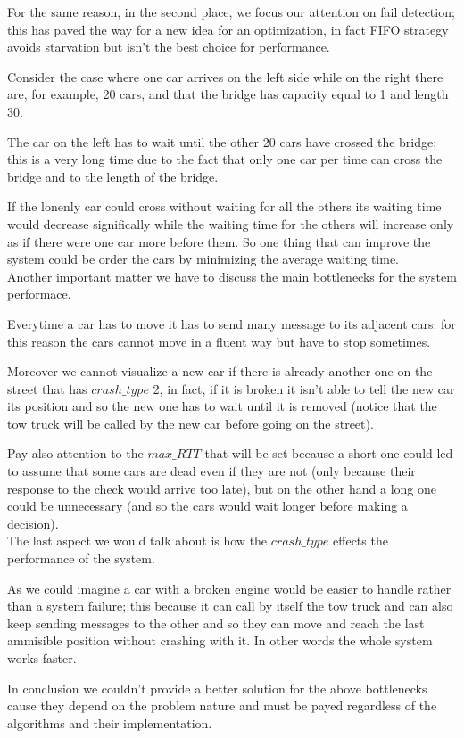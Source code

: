 For the same reason, in the second place, we focus our attention on 
fail detection; this has paved the way for a new idea for an optimization, 
in fact FIFO strategy avoids starvation but isn't the best choice for performance.

Consider the case where one car arrives on the left side while on the right there are, 
for example, 20 cars, and that the bridge has capacity equal to 1 and length 30. 

The car on the left has to wait until the other 20 cars have crossed the bridge; 
this is a very long time due to the fact that only one car per time can cross the bridge 
and to the length of the bridge.

If the lonenly car could cross without waiting for all the others its waiting time would 
decrease significally while the waiting time for the others will increase only 
as if there were one car more before them. 
So one thing that can improve the system could be order the cars by minimizing 
the average waiting time.\\

Another important matter we have to discuss the main bottlenecks
for the system performace. 

Everytime a car has to move it has to send many message to its adjacent cars: 
for this reason the cars cannot move in a fluent way but have to stop sometimes. 

Moreover we cannot visualize a new car if there is already another one on the 
street that has $crash\_type$ 2, in fact, if it is broken it isn't able to tell 
the new car its position and so the new one has to wait until it is removed 
(notice that the tow truck will be called by the new car before
going on the street).

Pay also attention to the $max\_RTT$ that will be set because a short one could led 
to assume that some cars are dead even if they are not 
(only because their response to the check would arrive too late), 
but on the other hand a long one could be unnecessary 
(and so the cars would wait longer before making a decision).\\

The last aspect we would talk about is how the $crash\_type$ effects the performance of 
the system. 

As we could imagine a car with a broken engine would be easier 
to handle rather than a system failure;
this because it can call by itself the tow truck and can also keep sending messages 
to the other and so they can move and reach the last ammisible position without 
crashing with it. In other words the whole system works faster.

In conclusion we couldn't provide a better solution for the above bottlenecks 
cause they depend on the problem nature and must be payed regardless 
of the algorithms and their implementation.